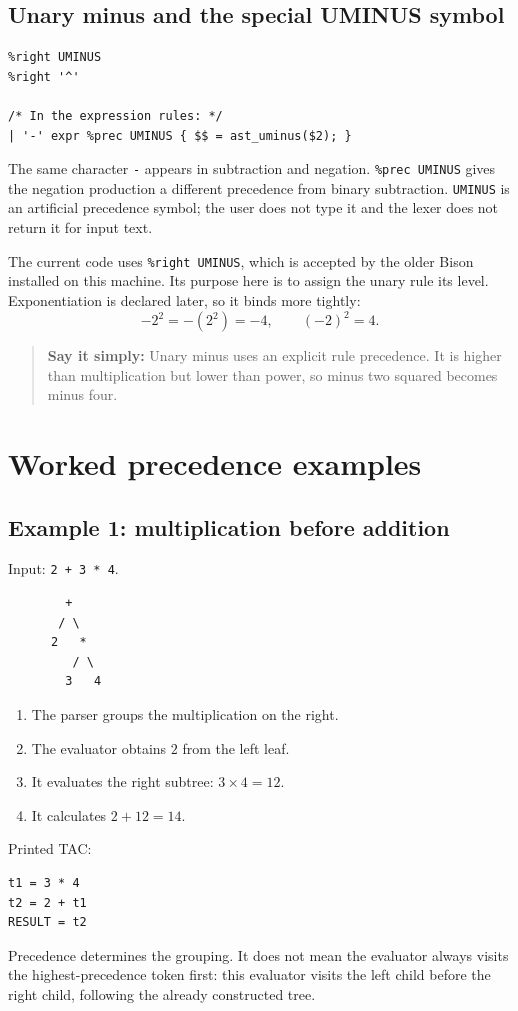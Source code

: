 \documentclass[11pt,a4paper]{report}
\newcommand{\say}[1]{\begin{quote}\textbf{Say it simply:} #1\end{quote}}
\begin{document}
\section{Unary minus and the special UMINUS symbol}
\begin{lstlisting}
%right UMINUS
%right '^'

/* In the expression rules: */
| '-' expr %prec UMINUS { $$ = ast_uminus($2); }
\end{lstlisting}
The same character \texttt{-} appears in subtraction and negation.
\texttt{\%prec UMINUS} gives the negation production a different precedence
from binary subtraction. \texttt{UMINUS} is an artificial precedence symbol;
the user does not type it and the lexer does not return it for input text.

The current code uses \texttt{\%right UMINUS}, which is accepted by the older
Bison installed on this machine. Its purpose here is to assign the unary rule
its level. Exponentiation is declared later, so it binds more tightly:
\[
-2^2=-(2^2)=-4,\qquad (-2)^2=4.
\]
\say{Unary minus uses an explicit rule precedence. It is higher than
multiplication but lower than power, so minus two squared becomes minus four.}

\chapter{Worked precedence examples}
\section{Example 1: multiplication before addition}
Input: \texttt{2 + 3 * 4}.
\begin{lstlisting}
        +
       / \
      2   *
         / \
        3   4
\end{lstlisting}
\begin{enumerate}
\item The parser groups the multiplication on the right.
\item The evaluator obtains $2$ from the left leaf.
\item It evaluates the right subtree: $3\times4=12$.
\item It calculates $2+12=14$.
\end{enumerate}
Printed TAC:
\begin{lstlisting}
t1 = 3 * 4
t2 = 2 + t1
RESULT = t2
\end{lstlisting}
Precedence determines the grouping. It does not mean the evaluator always
visits the highest-precedence token first: this evaluator visits the left
child before the right child, following the already constructed tree.
\end{document}
